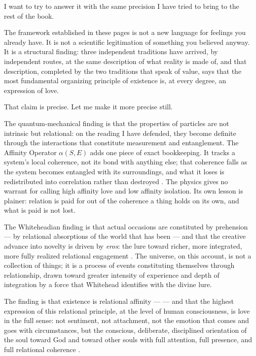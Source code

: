 I want to try to answer it with the same precision I have tried to bring to
the rest of the book.

The framework established in these pages is not a new language for feelings
you already have.  It is not a scientific legitimation of something you believed
anyway.  It is a structural finding: three independent traditions have arrived,
by independent routes, at the same description of what reality is made of, and
that description, completed by the two traditions that speak of value, says
that the most fundamental organizing principle of existence is, at every
degree, an expression of love.

That claim is precise.  Let me make it more precise still.

The quantum-mechanical finding is that the properties of particles are not
intrinsic but relational: on the reading I have defended, they become definite
through the interactions that constitute measurement and entanglement.  The
Affinity Operator $\alpha(S,E)$ adds one piece of exact bookkeeping.  It
tracks a system's local coherence, not its bond with anything else; that
coherence falls as the system becomes entangled with its surroundings, and
what it loses is redistributed into correlation rather than destroyed
\citep{AdamsRCT}.  The physics gives no warrant for calling high affinity love
and low affinity isolation.  Its own lesson is plainer: relation is paid for out
of the coherence a thing holds on its own, and what is paid is not lost.

The Whiteheadian finding is that actual occasions are constituted by prehension ---
by relational absorptions of the world that has been --- and that the creative
advance into novelty is driven by \emph{eros}: the lure toward richer, more
integrated, more fully realized relational engagement \citep{Whitehead1933}.  The
universe, on this account, is not a collection of things; it is a process of
events constituting themselves through relationship, drawn toward greater
intensity of experience and depth of integration by a force that Whitehead
identifies with the divine lure.

The \bahai finding is that existence is relational affinity --- \mahabbat ---
and that the highest expression of this relational principle, at the level of
human consciousness, is love in the full sense: not sentiment, not attachment,
not the emotion that comes and goes with circumstances, but the conscious,
deliberate, disciplined orientation of the soul toward God and toward other
souls with full attention, full presence, and full relational coherence
\citep{PUP,HiddenWords,SelectionsAbdul}.

